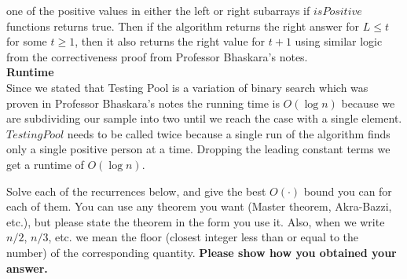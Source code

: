 \documentclass[addpoints, 11pt]{exam}
\begin{document}
\begin{questions}
\begin{parts}
one of the positive values in either the left or right subarrays if $isPositive$ functions returns true. Then if the algorithm returns the right answer for $L \leq t$ for some $t \geq 1$, then 
it also returns the right value for $t + 1$ using similar logic from the correctiveness proof from Professor Bhaskara's notes. \\
\textbf{Runtime} \\
Since we stated that Testing Pool is a variation of binary search which was proven in Professor Bhaskara's notes the running time is $O(\log n)$ because we are subdividing our sample into two
until we reach the case with a single element. $Testing Pool$ needs to be called twice because a single run of the algorithm finds only a single positive person at a time. Dropping the leading constant
terms we get a runtime of $O(\log n)$.
\end{parts}

Solve each of the recurrences below, and give the best $O(\cdot)$ bound you can for each of them. You can use any theorem you want (Master theorem, Akra-Bazzi, etc.), but please state the theorem in the form you use it. Also, when we write $n/2$, $n/3$, etc. we mean the floor (closest integer less than or equal to the number) of the corresponding quantity.  {\bf Please show how you obtained your answer.}

\end{questions}
\end{document}
